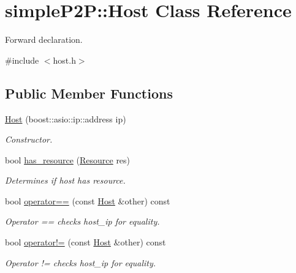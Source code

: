 \hypertarget{classsimpleP2P_1_1Host}{}\section{simple\+P2P\+:\+:Host Class Reference}
\label{classsimpleP2P_1_1Host}


Forward declaration.  




{\ttfamily \#include $<$host.\+h$>$}

\subsection*{Public Member Functions}
\begin{DoxyCompactItemize}
\item 
\hyperlink{classsimpleP2P_1_1Host_abbe0b5c51195b8cf2019d791ace5a5c7}{Host} (boost\+::asio\+::ip\+::address ip)
\begin{DoxyCompactList}\small\item\em Constructor. \end{DoxyCompactList}\item 
bool \hyperlink{classsimpleP2P_1_1Host_a5d4b48eaf05f5353816aae78cbd29c64}{has\+\_\+resource} (\hyperlink{classsimpleP2P_1_1Resource}{Resource} res)
\begin{DoxyCompactList}\small\item\em Determines if host has resource. \end{DoxyCompactList}\item 
bool \hyperlink{classsimpleP2P_1_1Host_aadac09c6ab516f62e5eebe28dd584626}{operator==} (const \hyperlink{classsimpleP2P_1_1Host}{Host} \&other) const
\begin{DoxyCompactList}\small\item\em Operator == checks host\+\_\+ip for equality. \end{DoxyCompactList}\item 
bool \hyperlink{classsimpleP2P_1_1Host_a13516e95bf59bb8dd6eea8940f8bb677}{operator!=} (const \hyperlink{classsimpleP2P_1_1Host}{Host} \&other) const
\begin{DoxyCompactList}\small\item\em Operator != checks host\+\_\+ip for equality. \end{DoxyCompactList}\end{DoxyCompactItemize}
